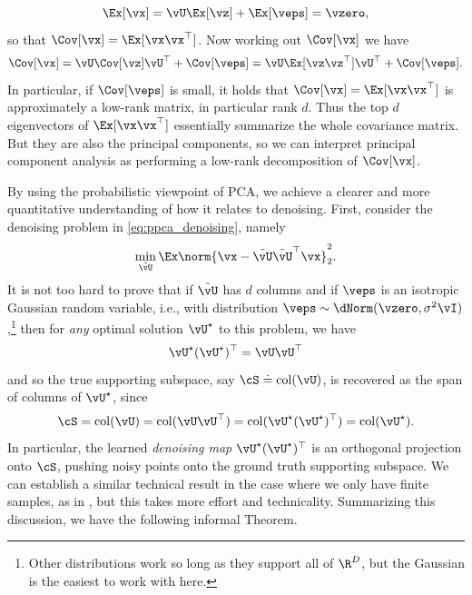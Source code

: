 \documentclass[../../book-main.tex]{subfiles}
\begin{document}
\begin{equation}
    \Ex[\vx] = \vU\Ex[\vz] + \Ex[\veps] = \vzero,
\end{equation}
so that \(\Cov[\vx] = \Ex[\vx\vx^{\top}]\). Now working out \(\Cov[\vx]\) we have 
\begin{equation}
    \Cov[\vx] = \vU\Cov[\vz]\vU^{\top} + \Cov[\veps] = \vU\Ex[\vz\vz^{\top}]\vU^{\top} + \Cov[\veps].
\end{equation}
In particular, if \(\Cov[\veps]\) is small, it holds that \(\Cov[\vx] = \Ex[\vx\vx^{\top}]\) is approximately a low-rank matrix, in particular rank \(d\). Thus the top \(d\) eigenvectors of \(\Ex[\vx\vx^{\top}]\) essentially summarize the whole covariance matrix. But they are also the principal components, so we can interpret principal component analysis as performing a low-rank decomposition of \(\Cov[\vx]\).

\begin{remark}
    By using the probabilistic viewpoint of PCA, we achieve a clearer and more quantitative understanding of how it relates to denoising. First, consider the denoising problem in \eqref{eq:ppca_denoising}, namely
    \begin{equation}
        \min_{\tilde{\vU}}\Ex\norm{\vx - \tilde{\vU}\tilde{\vU}^{\top}\vx}_{2}^{2}.
    \end{equation}
    It is not too hard to prove that if $\tilde{\vU}$ has $d$ columns and if
    \(\veps\) is an isotropic Gaussian
    random variable, i.e., with distribution \(\veps \sim \dNorm(\vzero,
    \sigma^{2}\vI)\),\footnote{Other distributions work so long as they support
    all of \(\R^{D}\), but the Gaussian is the easiest to work with here.} then
    for \textit{any} optimal solution
    \(\vU^{\star}\) to this problem, we have 
    \begin{equation}
        \vU^{\star}(\vU^{\star})^{\top} = \vU\vU^{\top}
    \end{equation}
    and so the true supporting subspace, say \(\cS \doteq \mathop{\mathrm{col}}(\vU)\), is
    recovered as the span of columns of \(\vU^{\star}\), since 
    \begin{equation}
        \cS = \mathop{\mathrm{col}}(\vU) = \mathop{\mathrm{col}}(\vU\vU^{\top})
        = \mathop{\mathrm{col}}(\vU^{\star}(\vU^{\star})^{\top})
        = \mathop{\mathrm{col}}(\vU^{\star}).
    \end{equation}
    In particular, the learned \textit{denoising map} \(\vU^{\star}(\vU^{\star})^{\top}\) is an orthogonal projection onto \(\cS\), pushing noisy points onto the ground truth supporting subspace. We can establish a similar technical result in the case where we only have finite samples, as in , but this takes more effort and technicality. Summarizing this discussion, we have the following informal Theorem.
\end{remark}
\end{document}

